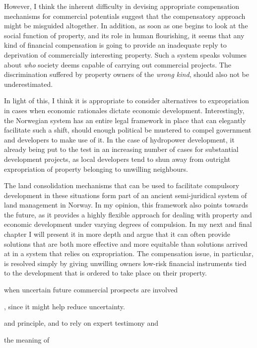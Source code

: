 However, I think the inherent difficulty in devising appropriate compensation mechanisms for commercial potentials suggest that the compensatory approach might be misguided altogether. In addition, as soon as one begins to look at the social function of property, and its role in human flourishing, it seems that any kind of financial compensation is going to provide an inadequate reply to deprivation of commercially interesting property. Such a system speaks volumes about {\it who} society deems capable of carrying out commercial projects. The discrimination suffered by property owners of the {\it wrong kind}, should also not be underestimated. 

In light of this, I think it is appropriate to consider alternatives to expropriation in cases when economic rationales dictate economic development. Interestingly, the Norwegian system has an entire legal framework in place that can elegantly facilitate such a shift, should enough political be mustered to compel government and developers to make use of it. In the case of hydropower development, it already being put to the test in an increasing number of cases for substantial development projects, as local developers tend to shun away from outright expropriation of property belonging to unwilling neighbours. 

The land consolidation mechanisms that can be used to facilitate compulsory development in these situations form part of an ancient semi-juridical system of land management in Norway. In my opinion, this framework also points towards the future, as it provides a highly flexible approach for dealing with property and economic development under varying degrees of compulsion. In my next and final chapter I will present it in more depth and argue that it can often provide solutions that are both more effective and more equitable than solutions arrived at in a system that relies on expropriation. The compensation issue, in particular, is resolved simply by giving unwilling owners low-risk financial instruments tied to the development that is ordered to take place on their property.








 when uncertain future commercial prospects are involved 


, since it might help reduce uncertainty.

and principle, and to rely on expert testimony and 
 

the meaning of 


